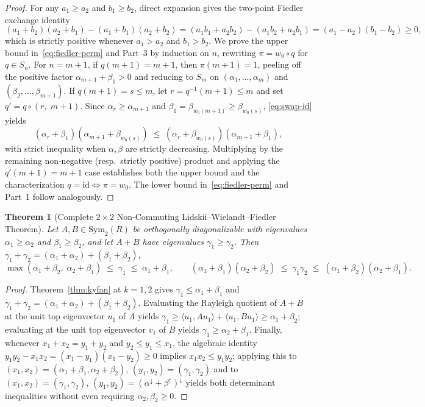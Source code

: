 \documentclass[11pt,a4paper]{article}
\theoremstyle{plain}
\newtheorem{theorem}{Theorem}[section]
\theoremstyle{definition}
\newcommand{\Sym}{\mathrm{Sym}}
\begin{document}
\begin{proof}
For any $a_1 \ge a_2$ and $b_1 \ge b_2$, direct expansion gives the two-point Fiedler exchange identity
\begin{equation}\label{eq:swap-id}
  (a_1 + b_2)(a_2 + b_1) - (a_1 + b_1)(a_2 + b_2)
  = (a_1 b_1 + a_2 b_2) - (a_1 b_2 + a_2 b_1)
  = (a_1 - a_2)(b_1 - b_2) \ge 0,
\end{equation}
which is strictly positive whenever $a_1 > a_2$ and $b_1 > b_2$. We prove the upper bound in~\eqref{eq:fiedler-perm} and Part~3 by induction on $n$, rewriting $\pi = w_0 \circ q$ for $q \in S_n$. For $n = m + 1$, if $q(m+1) = m + 1$, then $\pi(m+1) = 1$, peeling off the positive factor $\alpha_{m+1} + \beta_1 > 0$ and reducing to $S_m$ on $(\alpha_1,\dots,\alpha_m)$ and $(\beta_2,\dots,\beta_{m+1})$. If $q(m+1) = s \le m$, let $r = q^{-1}(m+1) \le m$ and set $q' = q \circ (r,\; m+1)$. Since $\alpha_r \ge \alpha_{m+1}$ and $\beta_1 = \beta_{w_0(m+1)} \ge \beta_{w_0(s)}$, \eqref{eq:swap-id} yields
\[
  (\alpha_r + \beta_1)(\alpha_{m+1} + \beta_{w_0(s)})
  \;\le\;
  (\alpha_r + \beta_{w_0(s)})(\alpha_{m+1} + \beta_1),
\]
with strict inequality when $\alpha, \beta$ are strictly decreasing. Multiplying by the remaining non-negative (resp.\ strictly positive) product and applying the $q'(m+1) = m+1$ case establishes both the upper bound and the characterization $q = \mathrm{id} \iff \pi = w_0$. The lower bound in~\eqref{eq:fiedler-perm} and Part~1 follow analogously.
\end{proof}

\begin{theorem}[Complete $2 \times 2$ Non-Commuting Lidskii--Wielandt--Fiedler Theorem]\label{thm:lwf-2x2}
Let $A, B \in \Sym_2(R)$ be orthogonally diagonalizable with eigenvalues $\alpha_1 \ge \alpha_2$ and $\beta_1 \ge \beta_2$, and let $A + B$ have eigenvalues $\gamma_1 \ge \gamma_2$. Then $\gamma_1 + \gamma_2 = (\alpha_1 + \alpha_2) + (\beta_1 + \beta_2)$,
\[
  \max(\alpha_1 + \beta_2,\; \alpha_2 + \beta_1) \;\le\; \gamma_1 \;\le\; \alpha_1 + \beta_1,
  \qquad
  (\alpha_1 + \beta_1)(\alpha_2 + \beta_2) \;\le\; \gamma_1 \gamma_2 \;\le\; (\alpha_1 + \beta_2)(\alpha_2 + \beta_1).
\]
\end{theorem}

\begin{proof}
Theorem~\ref{thm:kyfan} at $k = 1, 2$ gives $\gamma_1 \le \alpha_1 + \beta_1$ and $\gamma_1 + \gamma_2 = (\alpha_1 + \alpha_2) + (\beta_1 + \beta_2)$. Evaluating the Rayleigh quotient of $A + B$ at the unit top eigenvector $u_1$ of $A$ yields $\gamma_1 \ge \langle u_1, A u_1 \rangle + \langle u_1, B u_1 \rangle \ge \alpha_1 + \beta_2$; evaluating at the unit top eigenvector $v_1$ of $B$ yields $\gamma_1 \ge \alpha_2 + \beta_1$. Finally, whenever $x_1 + x_2 = y_1 + y_2$ and $y_2 \le y_1 \le x_1$, the algebraic identity $y_1 y_2 - x_1 x_2 = (x_1 - y_1)(x_1 - y_2) \ge 0$ implies $x_1 x_2 \le y_1 y_2$; applying this to $(x_1, x_2) = (\alpha_1 + \beta_1, \alpha_2 + \beta_2)$, $(y_1, y_2) = (\gamma_1, \gamma_2)$ and to $(x_1, x_2) = (\gamma_1, \gamma_2)$, $(y_1, y_2) = (\alpha^\downarrow + \beta^\uparrow)^\downarrow$ yields both determinant inequalities without even requiring $\alpha_2, \beta_2 \ge 0$.
\end{proof}
\end{document}
